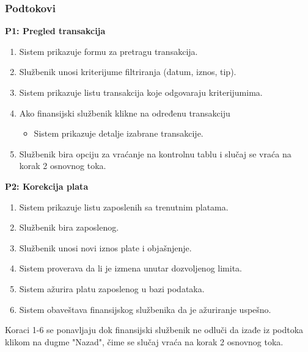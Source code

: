 \subsubsection*{Podtokovi}

\textbf{P1: Pregled transakcija}
\begin{enumerate}
    \item Sistem prikazuje formu za pretragu transakcija.
    \item Službenik unosi kriterijume filtriranja (datum, iznos, tip).
    \item Sistem prikazuje listu transakcija koje odgovaraju kriterijumima.
    \item Ako finansijski službenik klikne na određenu transakciju
    \begin{itemize}
        \item Sistem prikazuje detalje izabrane transakcije.
    \end{itemize}
    \item Službenik bira opciju za vraćanje na kontrolnu tablu i slučaj se vraća na korak 2 osnovnog toka.
\end{enumerate}

\textbf{P2: Korekcija plata}
\begin{enumerate}
    \item Sistem prikazuje listu zaposlenih sa trenutnim platama.
    \item Službenik bira zaposlenog.
    \item Službenik unosi novi iznos plate i objašnjenje.
    \item Sistem proverava da li je izmena unutar dozvoljenog limita.
    \item Sistem ažurira platu zaposlenog u bazi podataka.
    \item Sistem obaveštava finansijskog službenika da je ažuriranje uspešno.
\end{enumerate}
Koraci 1-6 se ponavljaju dok finansijski službenik ne odluči da izađe iz podtoka klikom na dugme "Nazad", čime se slučaj vraća na korak 2 osnovnog toka.

\vspace{0.5cm}

